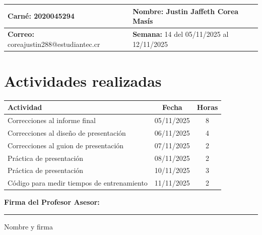 \documentclass[12pt,a4paper]{article}
\begin{document}
\noindent
\begin{tabularx}{\textwidth}{|X|X|}
\hline
\textbf{Carné:} 2020045294 & \textbf{Nombre:} Justin Jaffeth Corea Masís \\
\hline
\textbf{Correo:} coreajustin288@estudiantec.cr & \textbf{Semana:} 14 del 05/11/2025 al 12/11/2025 \\
\hline
\end{tabularx}

\vspace{0.5cm}

\section*{Actividades realizadas}

\begin{tabularx}{\textwidth}{|>{\raggedright\arraybackslash}p{12cm}|c|c|}
\hline
\textbf{Actividad} & \textbf{Fecha} & \textbf{Horas} \\
\hline
	Correcciones al informe final & 05/11/2025 & 8 \\
\hline
	Correcciones al diseño de presentación & 06/11/2025 & 4 \\
\hline
	Correcciones al guion de presentación & 07/11/2025 & 2 \\
\hline
	Práctica de presentación & 08/11/2025 & 2 \\
\hline
	Práctica de presentación & 10/11/2025 & 3 \\
\hline
	Código para medir tiempos de entrenamiento & 11/11/2025 & 2 \\
\hline
\end{tabularx}

\vspace{1cm}

\noindent
\textbf{Firma del Profesor Asesor:}

\vspace{2cm}

\noindent\rule{8cm}{0.4pt}  
Nombre y firma
\end{document}
